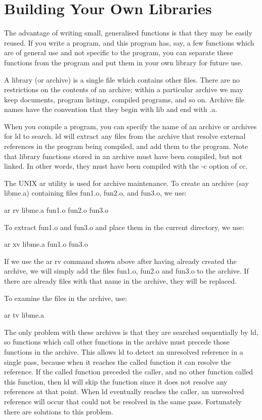 \section{Building Your Own Libraries}
     The advantage of writing small, generalised functions is that
they may be easily reused.  If you  write a  program, and  this
program  has, say,  a  few functions which  are of  general use  and
not specific to the program, you can separate these functions from
the program and put them in your own library for future use.

     A library (or {\kc archive}) is a single file which contains
other files. There are no restrictions on the contents of an archive;
within a particular archive we may keep documents, program listings,
compiled programs, and so on. Archive file names have the convention
that they begin with {\fn lib} and end with {\fn .a}.

     When you  compile a  program, you  can specify  the name of an
archive or archives for  {\cmd ld} to  search. {\cmd ld}  will extract
any files from the archive that resolve external references in the
program being compiled, and add them to the program. Note  that
library  functions stored in an archive must  have been compiled, but
not linked.  In  other words,  they must have been compiled with the
{\cmd -c} option of {\cmd cc}.

     The UNIX {\cmd ar} utility is used for archive maintenance. To
create an archive (say {\cmd libme.a}) containing files {\cmd fun1.o},
{\cmd fun2.o}, and {\cmd fun3.o}, we use:
\begin{display}\cmd
ar  rv  libme.a  fun1.o  fun2.o  fun3.o
\end{display}
\noindent
     To extract  {\cmd fun1.o} and {\cmd fun3.o} and place them in the
current directory, we use:
\begin{display}\cmd
ar  xv  libme.a  fun1.o  fun3.o
\end{display}
\noindent
     If we  use the {\cmd ar rv} command shown above after having
already created the archive, we  will simply add the  files {\cmd
fun1.o},  {\cmd fun2.o} and {\cmd fun3.o} to the archive.  If  there
are  already files with that name  in the archive, they will be
replaced.

     To examine the files in the archive,  use:
\begin{display}\cmd
ar  tv  libme.a
\end{display}
\noindent
     The  only  problem  with  these  archives  is  that  they  are
searched sequentially by  {\cmd ld}, so  functions which  call other
functions in the archive must precede  those functions in the
archive.  This allows {\cmd ld} to detect an unresolved reference in
a single pass, because when it  reaches the  called  function  it
can  resolve  the reference. If  the called  function preceded the
caller, and no other function called this  function, then  {\cmd ld}
will  skip the function since it does not resolve any references at
that point.  When {\cmd ld} eventually reaches the  caller, an
unresolved reference  will occur that could not be resolved in the
same pass. Fortunately there are solutions to this problem.

